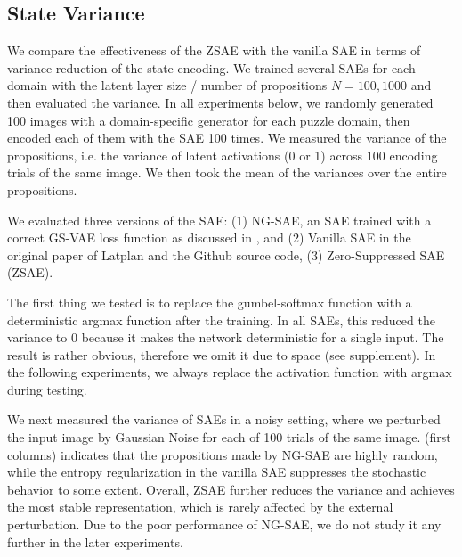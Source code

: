 \subsection{State Variance}

We compare the effectiveness of the ZSAE with the vanilla SAE in terms of variance reduction of the state encoding.
We trained several SAEs for each domain with the latent layer size / number of propositions $N=100,1000$
and then evaluated the variance.
In all experiments below,
we randomly generated 100 images with a domain-specific generator for each puzzle domain,
then encoded each of them with the SAE 100 times.
We measured the variance of the propositions, i.e. the variance of latent activations (0 or 1)
across 100 encoding trials of the same image.
We then took the mean of the variances over the entire propositions.

We evaluated three versions of the SAE:
(1) NG-SAE, an SAE trained with a correct GS-VAE loss function as discussed in , and
(2) Vanilla SAE in the original paper of Latplan \cite{Asai2018} and the Github source code,
(3) Zero-Suppressed SAE (ZSAE).

The first thing we tested is to replace the gumbel-softmax function with a deterministic argmax function
after the training.
In all SAEs,
this reduced the variance to 0 because it makes the network deterministic for a single input.
The result is rather obvious, therefore we omit it due to space (see supplement).
In the following experiments, we always replace the activation function with argmax during testing.

We next measured the variance of SAEs in a noisy setting, where
we perturbed the input image by Gaussian Noise for each of 100 trials of the same image.
 (first columns) indicates that
the propositions made by NG-SAE are highly random,
while the entropy regularization in the vanilla SAE suppresses the stochastic behavior to some extent.
Overall, ZSAE further reduces the variance and achieves the most stable representation,
which is rarely affected by the external perturbation.
% 
Due to the poor performance of NG-SAE, we do not study it any further in the later experiments.


